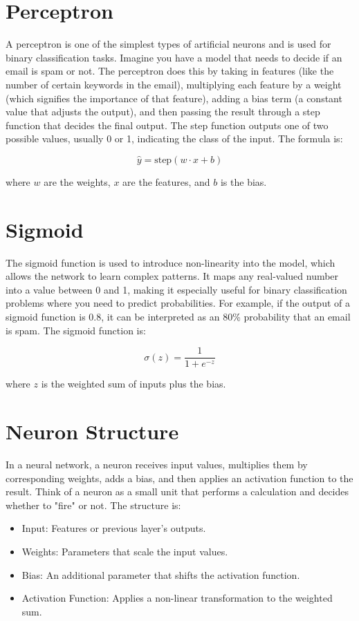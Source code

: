 \section{Perceptron}
A perceptron is one of the simplest types of artificial neurons and is used for binary classification tasks. Imagine you have a model that needs to decide if an email is spam or not. The perceptron does this by taking in features (like the number of certain keywords in the email), multiplying each feature by a weight (which signifies the importance of that feature), adding a bias term (a constant value that adjusts the output), and then passing the result through a step function that decides the final output. The step function outputs one of two possible values, usually 0 or 1, indicating the class of the input. The formula is:

\[
\hat{y} = \text{step}(w \cdot x + b)
\]

where \( w \) are the weights, \( x \) are the features, and \( b \) is the bias.

\section{Sigmoid}
The sigmoid function is used to introduce non-linearity into the model, which allows the network to learn complex patterns. It maps any real-valued number into a value between 0 and 1, making it especially useful for binary classification problems where you need to predict probabilities. For example, if the output of a sigmoid function is 0.8, it can be interpreted as an 80\% probability that an email is spam. The sigmoid function is:

\[
\sigma(z) = \frac{1}{1 + e^{-z}}
\]

where \( z \) is the weighted sum of inputs plus the bias.

\section{Neuron Structure}
In a neural network, a neuron receives input values, multiplies them by corresponding weights, adds a bias, and then applies an activation function to the result. Think of a neuron as a small unit that performs a calculation and decides whether to "fire" or not. The structure is:
\begin{itemize}
    \item Input: Features or previous layer’s outputs.
    \item Weights: Parameters that scale the input values.
    \item Bias: An additional parameter that shifts the activation function.
    \item Activation Function: Applies a non-linear transformation to the weighted sum.
\end{itemize}

